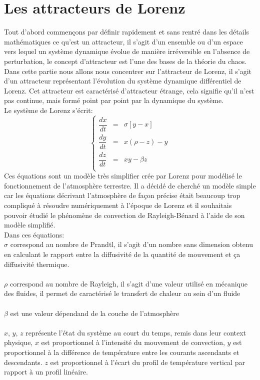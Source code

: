 \chapter{Les attracteurs de Lorenz}
Tout d’abord commençons par définir rapidement et sans rentré dans les détails mathématiques ce qu’est un attracteur,
 il s’agit d’un ensemble ou d’un espace vers lequel un système dynamique évolue de manière
 irréversible en l’absence de perturbation, le concept d’attracteur est l’une des bases de la théorie du chaos. 
 Dans cette partie nous allons nous concentrer sur l’attracteur de Lorenz, il s’agit d’un attracteur
représentant l’évolution du système dynamique différentiel de Lorenz. Cet attracteur est caractérisé d'attracteur étrange, cela signifie qu'il n'est pas continue, mais formé point par point par la dynamique du système.\\

Le système de Lorenz s'écrit: 
\[
    \left\{
    \begin{array}{rcl}
        \dfrac{dx}{dt}&=&\sigma[y-x]\\
        \dfrac{dy}{dt}&=&x(\rho-z)-y\\
        \dfrac{dz}{dt}&=&xy-\beta z\\
    \end{array}
    \right.
\]
Ces équations sont un modèle très simplifier crée par Lorenz pour modélisé le fonctionnement 
de l’atmosphère terrestre. Il a décidé de cherché un modèle simple car 
les équations décrivant l’atmosphère de façon précise était beaucoup trop compliqué à résoudre
 numériquement à l’époque de Lorenz et il souhaitais pouvoir étudié  le phénomène de convection
de Rayleigh-Bénard à l’aide de son modèle simplifié.\\


Dans ces équations: \\
$\sigma$  correspond au nombre de Prandtl, il s'agit d'un nombre sans dimension obtenu en calculant le rapport entre la diffusivité de la quantité de mouvement et ça diffusivité thermique.\\\\
$\rho$    correspond au nombre de Rayleigh, il s'agit d'une valeur utilisé en mécanique des fluides, il permet de caractérisé le transfert de chaleur au sein d'un fluide \\\\
$\beta $  est une valeur dépendand de la couche de l'atmosphère\\\\
$x$, $y$, $z$ représente l'état du système au court du temps, remis dans leur context physique, $x$ est proportionnel à l'intensité du mouvement de convection, $y$ est proportionnel à la différence de température entre les courants ascendants et descendants. $z$ est proportionnel à l'écart du profil de température vertical par rapport à un profil linéaire.    

